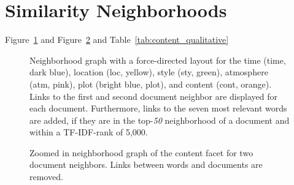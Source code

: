 \documentclass[11pt]{article}
\begin{document}
\section{Similarity Neighborhoods}
Figure~\ref{fig:neighborhood_overall} and Figure~\ref{fig:neighborhood_content} and Table~\ref{tab:content_qualitative}

\begin{figure}
	\centering
	\caption{Neighborhood graph with a force-directed layout for the time (time, dark blue), location (loc, yellow), style (sty, green), atmosphere (atm, pink), plot (bright blue, plot), and content (cont, orange). Links to the first and second document neighbor are displayed for each document. Furthermore, links to the seven most relevant words are added, if they are in the top-\textit{50} neighborhood of a document and within a TF-IDF-rank of 5,000.}
	\label{fig:neighborhood_overall}
\end{figure}

\begin{figure}
	\centering
	\caption{Zoomed in neighborhood graph of the content facet for two document neighbors. Links between words and documents are removed.}
	\label{fig:neighborhood_content}
\end{figure}
\end{document}
